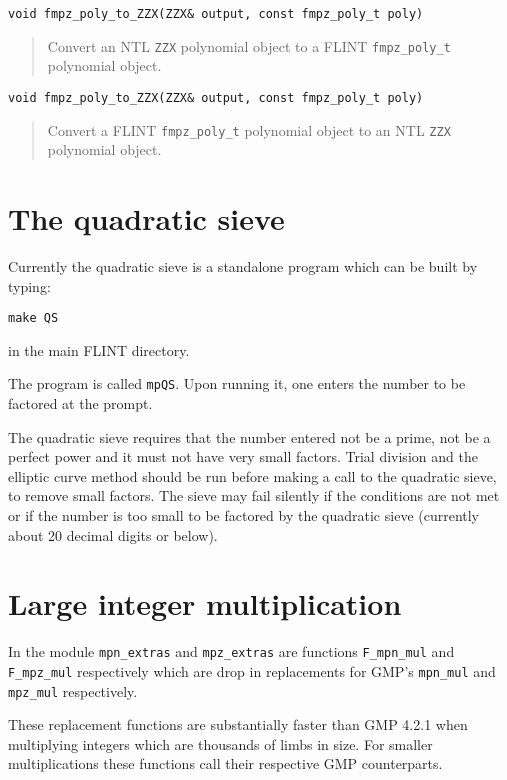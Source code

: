 \documentclass[a4paper,10pt]{article}
\newcommand{\code}{\lstinline}
\begin{document}
\begin{lstlisting}
void fmpz_poly_to_ZZX(ZZX& output, const fmpz_poly_t poly)
\end{lstlisting}
\begin{quote}
Convert an NTL \code{ZZX} polynomial object to a FLINT \code{fmpz_poly_t} polynomial object.
\end{quote}

\begin{lstlisting}
void fmpz_poly_to_ZZX(ZZX& output, const fmpz_poly_t poly)
\end{lstlisting}
\begin{quote}
Convert a FLINT \code{fmpz_poly_t} polynomial object to an NTL \code{ZZX} polynomial object.
\end{quote}

\section{The quadratic sieve}
Currently the quadratic sieve is a standalone program which can be built by typing:

\code{make QS}

in the main FLINT directory.

The program is called \code{mpQS}. Upon running it, one enters the number to be factored at the prompt. 

The quadratic sieve requires that the number entered not be a prime, not be a perfect power and it must not have very small factors. Trial division and the elliptic curve method should be run before making a call to the quadratic sieve, to remove small factors. The sieve may fail silently if the conditions are not met or if the number is too small to be factored by the quadratic sieve (currently about 20 decimal digits or below).

\section{Large integer multiplication}
In the module \code{mpn_extras} and \code{mpz_extras} are functions \code{F_mpn_mul} and \code{F_mpz_mul} respectively which are drop in replacements for GMP's \code{mpn_mul} and \code{mpz_mul} respectively. 

These replacement functions are substantially faster than GMP 4.2.1 when multiplying integers which are thousands of limbs in size. For smaller multiplications these functions call their respective GMP counterparts.



\end{document}
